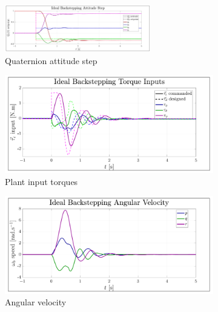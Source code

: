 \begin{figure}[htbp]
\vspace{-10pt}
\centering
\begin{subfigure}{\textwidth}
\centering
\includegraphics[width=0.7\textwidth]{graphs/IBC_Step}
\vspace{-6pt}
\caption{Quaternion attitude step}
\label{fig:IBC_Step}
\end{subfigure}
\begin{subfigure}{0.49\textwidth}
\centering
\includegraphics[width=\textwidth]{graphs/IBC_Torque}
\vspace{-20pt}
\caption{Plant input torques}
\label{fig:IBC_Torque}
\end{subfigure}
\begin{subfigure}{0.49\textwidth}
\centering
\includegraphics[width=\textwidth]{graphs/IBC_Angular}
\vspace{-20pt}
\caption{Angular velocity}
\label{fig:IBC_Angular}
\end{subfigure}
\begin{subfigure}{\textwidth}

\end{subfigure}
\end{figure}

